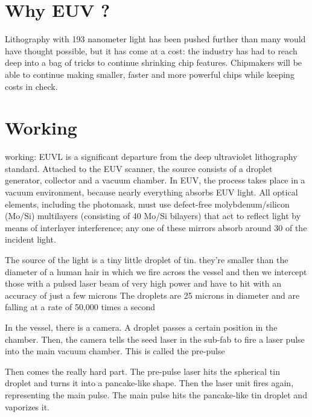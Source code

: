 \documentclass[12pt,a4paper]{report}
\begin{document}
\section{Why EUV ?}
Lithography with 193 nanometer light has been 
pushed further than many would 
have thought possible, but it has come at a cost: 
the industry has had to reach 
deep into a bag of tricks to continue shrinking 
chip features. Chipmakers will be 
able to continue making smaller, faster and 
more powerful chips while keeping 
costs in check.



\section{Working}

working: 
EUVL is a significant departure from the deep 
ultraviolet lithography standard. 
Attached to the EUV scanner, the source consists 
of a droplet generator, collector and a vacuum chamber. 
In EUV, the process takes place in a vacuum 
environment, because nearly everything absorbs 
EUV light.
{All optical elements, including the photomask,
 must use defect-free molybdenum/silicon (Mo/Si) 
 multilayers (consisting of 40 Mo/Si bilayers) that 
act to reflect light by means of interlayer 
interference; any one of these mirrors absorb
 around 30%
of the incident light.
}

The source of the light is a tiny little droplet of tin.
 they're smaller than 
the diameter of a human hair in which we fire 
across the vessel and then we intercept those 
with a pulsed laser 
beam of very high power and have to hit with 
an accuracy of just a few microns
The droplets are 25 microns in diameter and 
are falling at a rate of 50,000 times a second


In the vessel, there is a camera. A droplet 
passes a certain position in the chamber. 
Then, the camera tells the seed laser in the 
sub-fab to fire a laser pulse into the main 
vacuum chamber. This is called the pre-pulse

Then comes the really hard part. The pre-pulse 
laser hits the spherical tin droplet and turns 
it into a pancake-like shape. Then the laser 
unit fires again, representing the main pulse. 
The main pulse hits the pancake-like tin droplet
 and vaporizes it.
\end{document}
